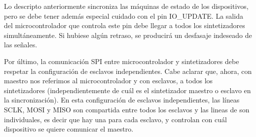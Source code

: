 \documentclass{article}
\newenvironment{standalone}{\begin{preview}}{\end{preview}}
\begin{document}
\begin{standalone}
  Lo descripto anteriormente sincroniza las máquinas de estado de los dispositivos, pero se debe tener además especial cuidado con el pin IO\_UPDATE.
  La salida del microcontrolador que controla este pin debe llegar a todos los sintetizadores simultáneamente.
  Si hubiese algún retraso, se producirá un desfasaje indeseado de las señales.

  Por último, la comunicación SPI entre microcontrolador y sintetizadores debe respetar la configuración de esclavos independientes.
  Cabe aclarar que, ahora, con maestro nos referimos al microcontrolador y con esclavos, a todos los sintetizadores (independientemente de cuál es el sintetizador maestro o esclavo en la sincronización).
  En esta configuración de esclavos independientes, las líneas SCLK, MOSI y MISO son compartida entre todos los esclavos y las lineas de  son individuales, es decir que hay una para cada esclavo, y controlan con cuál dispositivo se quiere comunicar el maestro.

\end{standalone}
\end{document}
